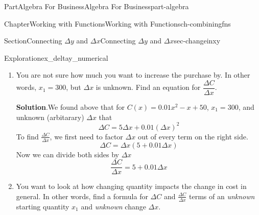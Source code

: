 \documentclass[oneside,10pt,]{tufte-book}
\newcommand{\blocktitlefont}{\relax}
\numberwithin{equation}{chapter}
\newcommand{\amp}{&}
\begin{document}
\begin{partptx}{Part}{Algebra For Business}{}{Algebra For Business}{}{}{part-algebra}
\begin{chapterptx}{Chapter}{Working with Functions}{}{Working with Functions}{}{}{ch-combiningfns}
\begin{sectionptx}{Section}{\textasteriskcentered{}Connecting \(\Delta y\) and \(\Delta x\)}{}{\textasteriskcentered{}Connecting \(\Delta y\) and \(\Delta x\)}{}{}{sec-changeinxy}
\begin{exploration}{Exploration}{}{ex_deltay_numerical}
\begin{enumerate}[font=\bfseries,label=(\alph*),ref=\alph*]
We can now compute \(C_1\) and \(C_2\)%
\begin{equation*}
C_1 = C(300) = 0.01(300)^2 - 300 + 50 = 650
\end{equation*}
and%
\begin{align*}
C_2 \amp = C\Big(300 + \Delta x\Big)\\
\amp = 0.01\Big(300 + \Delta x\Big)^2 - \Big(300 + \Delta x\Big) + 50 \\
\amp = 0.01\Big(300\cdot 300 + 2\cdot 300\cdot \Delta x + (\Delta x)^2\Big) - \Big(300 + \Delta x\Big) + 50 \\
\amp = 900 + 6\cdot \Delta x + 0.01(\Delta x)^2 - 300 - \Delta x + 50 \\
\amp = 650 + 5\cdot \Delta x + 0.01(\Delta x)^2  
\end{align*}
We have found that%
\begin{align*}
C_1 \amp = 650 \\
C_2 \amp = 650 + 5\cdot \Delta x + 0.01(\Delta x)^2  
\end{align*}
We can now compute%
\begin{align*}
\Delta C \amp = C_2 - C_1 \\
\amp = \Big(650+5\Delta x + 0.01(\Delta x)^2\Big) - \Big(650\Big)\\
\Delta C \amp = 5\Delta x + 0.01(\Delta x)^2 
\end{align*}
%
\item{}You are not sure how much you want to increase the purchase by.  In other words, \(x_1=300\), but \(\Delta x\) is unknown. Find an equation for \(\dfrac{\Delta C}{\Delta x}\).%
\par\smallskip%
\noindent\textbf{\blocktitlefont Solution}.\hypertarget{ex_deltay_numerical-6-2}{}\quad{}We found above that for \(C(x) =  0.01 x^2 - x+ 50\),  \(x_1=300\), and unknown (arbitarary) \(\Delta x\) that%
\begin{equation*}
\Delta C = 5\Delta x + 0.01(\Delta x)^2 
\end{equation*}
To find \(\frac{\Delta C}{\Delta x}\), we first need to factor \(\Delta x\) out of every term on the right side.%
\begin{equation*}
\Delta C = \Delta x(5 + 0.01 \Delta x) 
\end{equation*}
Now we can divide both sides by \(\Delta x\)%
\begin{equation*}
\dfrac{\Delta C}{\Delta x} = 5 + 0.01 \Delta x 
\end{equation*}
%
\item{}You want to look at how changing quantity impacts the change in cost in general.  In other words, find a formula for \(\Delta C\) and \(\frac{\Delta C}{\Delta x}\) terms of an \emph{unknown} starting quantity \(x_1\) and \emph{unknown} change \(\Delta x\).%

\end{enumerate}
\end{exploration}
\end{sectionptx}
\end{chapterptx}
\end{partptx}
\end{document}
